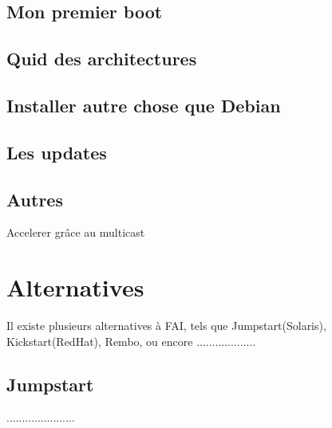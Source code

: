 \documentclass[a4paper,12pt,one side,titlepage]{report}
\begin{document}
\section{Mon premier boot}

\section{Quid des architectures}

\section{Installer autre chose que Debian}

\section{Les updates}

\section{Autres}
    Accelerer grâce au multicast

\chapter{Alternatives}
Il existe plusieurs alternatives à FAI, tels que Jumpstart(Solaris), Kickstart(RedHat), Rembo, ou encore ...................

\section{Jumpstart}
......................
\end{document}
